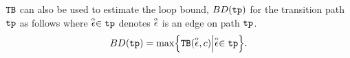 ${\mathtt{TB}}$ can also be used to estimate the loop bound, $BD(\mathtt{tp})$ for the transition path $\mathtt{tp}$ as follows
where $\stackrel{\scriptscriptstyle{\alpha}}{\mathtt{\epsilon}{}} \in \mathtt{tp}$ denotes $\stackrel{\scriptscriptstyle{\alpha}}{\mathtt{\epsilon}{}}$ is an edge on path $\mathtt{tp}$.
\begin{equation}
  \label{eq:absBD}
  BD(\tpath) = \max\left\{ \absclr(\absevent, c) \middle\vert \absevent \in \tpath \right\}.
\end{equation}
